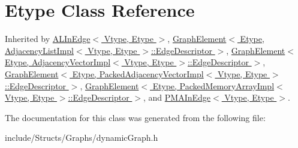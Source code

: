 \hypertarget{class_etype}{
\section{Etype Class Reference}
\label{class_etype}
}


Inherited by \hyperlink{class_a_l_in_edge}{ALInEdge$<$ Vtype, Etype $>$}, \hyperlink{class_graph_element}{GraphElement$<$ Etype, AdjacencyListImpl$<$ Vtype, Etype $>$::EdgeDescriptor $>$}, \hyperlink{class_graph_element}{GraphElement$<$ Etype, AdjacencyVectorImpl$<$ Vtype, Etype $>$::EdgeDescriptor $>$}, \hyperlink{class_graph_element}{GraphElement$<$ Etype, PackedAdjacencyVectorImpl$<$ Vtype, Etype $>$::EdgeDescriptor $>$}, \hyperlink{class_graph_element}{GraphElement$<$ Etype, PackedMemoryArrayImpl$<$ Vtype, Etype $>$::EdgeDescriptor $>$}, and \hyperlink{class_p_m_a_in_edge}{PMAInEdge$<$ Vtype, Etype $>$}.



The documentation for this class was generated from the following file:\begin{DoxyCompactItemize}
\item 
include/Structs/Graphs/dynamicGraph.h\end{DoxyCompactItemize}
